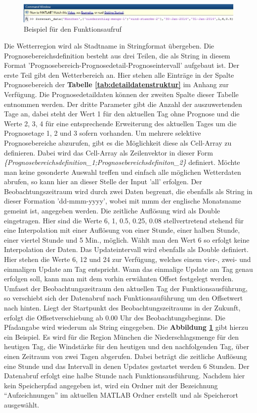\begin{figure}
\centering
\includegraphics[scale=0.7]{programm/funkaufruf}
\caption{Beispiel für den Funktionsaufruf}
\label{fig:funkaufruf}
\end{figure}
Die Wetterregion wird als Stadtname in Stringformat übergeben. Die Prognosebereichsdefinition besteht aus drei Teilen, die als String in diesem Format 'Prognosebereich-Prognosedetail-Prognoseintervall' aufgebaut ist. Der erste Teil gibt den Wetterbereich an. Hier stehen alle Einträge in der Spalte Prognosebereich der \textbf{Tabelle \ref{tab:detaildatenstruktur}} im Anhang zur Verfügung. Die Prognosedetaildaten können der zweiten Spalte dieser Tabelle entnommen werden. Der dritte Parameter gibt die Anzahl der auszuwertenden Tage an, dabei steht der Wert 1 für den aktuellen Tag ohne Prognose und die Werte 2, 3, 4 für eine entsprechende Erweiterung des aktuellen Tages um die Prognosetage 1, 2 und 3 sofern vorhanden. Um mehrere selektive Prognosebereiche abzurufen, gibt es die Möglichkeit diese als Cell-Array zu definieren. Dabei wird das Cell-Array als Zeilenvektor in dieser Form \textit{\{Prognosebereichsdefinition\_1;Prognosebereichsdefiniton\_2\}} definiert. Möchte man keine gesonderte Auswahl treffen und einfach alle möglichen Wetterdaten abrufen, so kann hier an dieser Stelle der Input 'all' erfolgen. Der Beobachtungszeitraum wird durch zwei Daten begrenzt, die ebenfalls als String in dieser Formation 'dd-mmm-yyyy', wobei mit mmm der englische Monatsname gemeint ist, angegeben werden. Die zeitliche Auflösung wird als Double eingetragen. Hier sind die Werte 6, 1, 0.5, 0.25, 0.08 stellvertretend stehend für eine Interpolation mit einer Auflösung von einer Stunde, einer halben Stunde, einer viertel Stunde und 5 Min., möglich. Wählt man den Wert 6 so erfolgt keine Interpolation der Daten. Das Updateintervall wird ebenfalls als Double definiert. Hier stehen die Werte 6, 12 und 24 zur Verfügung, welches einem vier-, zwei- und einmaligen Update am Tag entspricht. Wann das einmalige Update am Tag genau erfolgen soll, kann man mit dem vorhin erwähnten Offset festgelegt werden. Umfasst der Beobachtungszeitraum den aktuellen Tag der Funktionsausführung, so verschiebt sich der Datenabruf nach Funktionsauführung um den Offsetwert nach hinten. Liegt der Startpunkt des Beobachtungszeitraums in der Zukunft, erfolgt die Offsetverschiebung ab 0.00 Uhr des Beobachtungsbeginns. Die Pfadangabe wird wiederum als String eingegeben. Die \textbf{Abbildung \ref{fig:funkaufruf}} gibt hierzu ein Beispiel. Es wird für die Region München die Niederschlagsmenge für den heutigen Tag, die Windstärke für den heutigen und den nachfolgenden Tag, über einen Zeitraum von zwei Tagen abgerufen. Dabei beträgt die zeitliche Auflösung eine Stunde und das Intervall in denen Updates gestartet werden 6 Stunden. Der Datenabruf erfolgt eine halbe Stunde nach Funktionsausführung. Nachdem hier kein Speicherpfad angegeben ist, wird ein Ordner mit der Bezeichnung \enquote{Aufzeichnungen} im aktuellen MATLAB Ordner erstellt und als Speicherort ausgewählt. 
